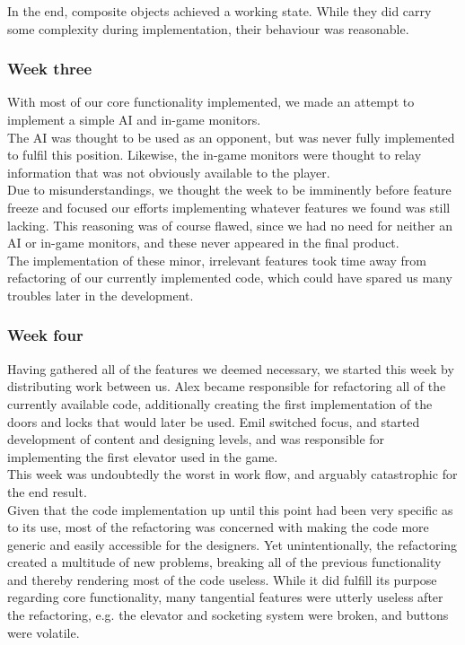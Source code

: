 In the end, composite objects achieved a working state. While they did carry some complexity during implementation, their behaviour was reasonable.

\subsubsection{Week three}
With most of our core functionality implemented, we made an attempt to implement a simple AI and in-game monitors.\\

The AI was thought to be used as an opponent, but was never fully implemented to fulfil this position. Likewise, the in-game monitors were thought to relay information that was not obviously available to the player.\\

Due to misunderstandings, we thought the week to be imminently before feature freeze and focused our efforts implementing whatever features we found was still lacking. This reasoning was of course flawed, since we had no need for neither an AI or in-game monitors, and these never appeared in the final product.\\

The implementation of these minor, irrelevant features took time away from refactoring of our currently implemented code, which could have spared us many troubles later in the development.

\subsubsection{Week four}
Having gathered all of the features we deemed necessary, we started this week by distributing work between us. Alex became responsible for refactoring all of the currently available code, additionally creating the first implementation of the doors and locks that would later be used. Emil switched focus, and started development of content and designing levels, and was responsible for implementing the first elevator used in the game.\\

This week was undoubtedly the worst in work flow, and arguably catastrophic for the end result.\\

Given that the code implementation up until this point had been very specific as to its use, most of the refactoring was concerned with making the code more generic and easily accessible for the designers. Yet unintentionally, the refactoring created a multitude of new problems, breaking all of the previous functionality and thereby rendering most of the code useless. While it did fulfill its purpose regarding core functionality, many tangential features were utterly useless after the refactoring, e.g. the elevator and socketing system were broken, and buttons were volatile.\\


